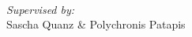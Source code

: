 
\begin{titlepage}
\begin{adjustwidth}{-4em}{-4em}
    \begin{center}
        {\huge  

        \hfill

        \vfill

        {\spacedlowsmallcaps{\myName}} \\ \bigskip

        {\color{Blue}\spacedallcaps{\myTitle}} 

        }
    	\bigskip
    	\bigskip
		\mySubTitle

        \vfill


		
		\medskip
		\textit{Supervised by:}\\ Sascha Quanz \& Polychronis Patapis
        \vfill                      

    \end{center} 
\end{adjustwidth}      
\end{titlepage} 